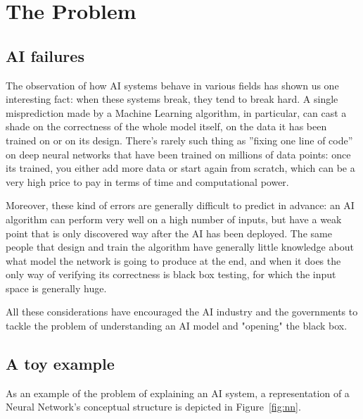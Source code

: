 \documentclass[conference]{IEEEtran}
\begin{document}
\section{The Problem}
\label{sec:problem}

\subsection{AI failures}
\label{sec:aifails}

The observation of how AI systems behave in various fields has shown
us one interesting fact: when these systems break, they tend to break hard. A single
misprediction made by a Machine Learning algorithm, in particular, can cast a shade on the correctness of the whole model
itself, on the data it has been trained on or on its design. There's rarely such
thing as ''fixing one line of code'' on deep neural networks that have been
trained on millions of data points: once its trained, you either add more data
or start again from scratch, which can be a very high price to pay in terms of
time and computational power.


Moreover, these kind of errors are generally difficult to predict in advance: an
AI algorithm can perform very well on a high number of inputs, but have a weak
point that is only discovered way after the AI has been deployed. The same people that design and train the algorithm have generally little
knowledge about what model the network is going to produce at the end, and when
it does the only way of verifying its correctness is black box testing, for
which the input space is generally huge.

All these considerations have encouraged the AI industry and the governments to
tackle the problem of understanding an AI model and "opening" the black box.

\subsection{A toy example}
\label{sec:example}

As an example of the problem of explaining an AI system, a representation of a Neural Network's conceptual structure is depicted in Figure~\ref{fig:nn}.
\end{document}
